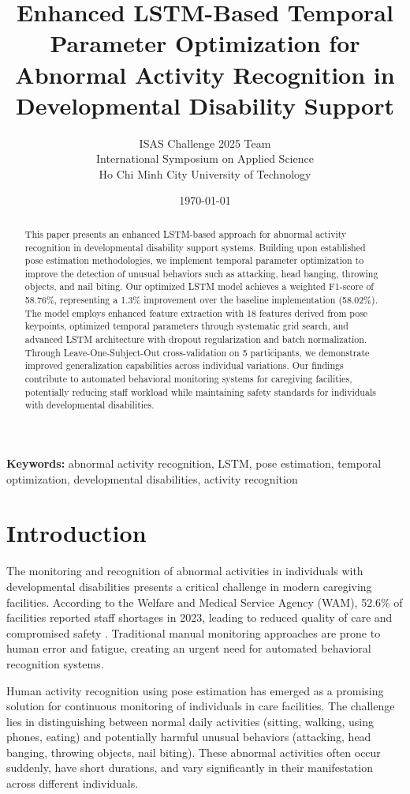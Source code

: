 \documentclass[a4paper,11pt]{article}
\title{Enhanced LSTM-Based Temporal Parameter Optimization for Abnormal Activity Recognition in Developmental Disability Support}
\author{ISAS Challenge 2025 Team\\
International Symposium on Applied Science\\
Ho Chi Minh City University of Technology}
\date{\today}
\begin{document}
\maketitle

\begin{abstract}
This paper presents an enhanced LSTM-based approach for abnormal activity recognition in developmental disability support systems. Building upon established pose estimation methodologies, we implement temporal parameter optimization to improve the detection of unusual behaviors such as attacking, head banging, throwing objects, and nail biting. Our optimized LSTM model achieves a weighted F1-score of 58.76\%, representing a \textcolor{improvement}{1.3\% improvement} over the baseline implementation (58.02\%). The model employs enhanced feature extraction with 18 features derived from pose keypoints, optimized temporal parameters through systematic grid search, and advanced LSTM architecture with dropout regularization and batch normalization. Through Leave-One-Subject-Out cross-validation on 5 participants, we demonstrate improved generalization capabilities across individual variations. Our findings contribute to automated behavioral monitoring systems for caregiving facilities, potentially reducing staff workload while maintaining safety standards for individuals with developmental disabilities.
\end{abstract}

\textbf{Keywords:} abnormal activity recognition, LSTM, pose estimation, temporal optimization, developmental disabilities, activity recognition

\section{Introduction}

The monitoring and recognition of abnormal activities in individuals with developmental disabilities presents a critical challenge in modern caregiving facilities. According to the Welfare and Medical Service Agency (WAM), 52.6\% of facilities reported staff shortages in 2023, leading to reduced quality of care and compromised safety \cite{wam2023}. Traditional manual monitoring approaches are prone to human error and fatigue, creating an urgent need for automated behavioral recognition systems.

Human activity recognition using pose estimation has emerged as a promising solution for continuous monitoring of individuals in care facilities. The challenge lies in distinguishing between normal daily activities (sitting, walking, using phones, eating) and potentially harmful unusual behaviors (attacking, head banging, throwing objects, nail biting). These abnormal activities often occur suddenly, have short durations, and vary significantly in their manifestation across different individuals.
\end{document}
